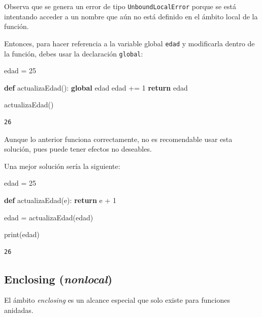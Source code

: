 \documentclass[
  spanish,
  letterpaper,
]{scrbook}
\newenvironment{Shaded}{\begin{snugshade}}{\end{snugshade}}
\newcommand{\BuiltInTok}[1]{\textcolor[rgb]{0.00,0.23,0.31}{#1}}
\newcommand{\ControlFlowTok}[1]{\textcolor[rgb]{0.00,0.23,0.31}{\textbf{#1}}}
\newcommand{\DecValTok}[1]{\textcolor[rgb]{0.68,0.00,0.00}{#1}}
\newcommand{\KeywordTok}[1]{\textcolor[rgb]{0.00,0.23,0.31}{\textbf{#1}}}
\newcommand{\NormalTok}[1]{\textcolor[rgb]{0.00,0.23,0.31}{#1}}
\newcommand{\OperatorTok}[1]{\textcolor[rgb]{0.37,0.37,0.37}{#1}}
\theoremstyle{definition}
\theoremstyle{remark}
\begin{document}
Observa que se genera un error de tipo \texttt{UnboundLocalError} porque
se está intentando acceder a un nombre que aún no está definido en el
ámbito local de la función.

Entonces, para hacer referencia a la variable global \texttt{edad} y
modificarla dentro de la función, debes usar la declaración
\texttt{global}:

\begin{Shaded}
\begin{Highlighting}[]
\NormalTok{edad }\OperatorTok{=} \DecValTok{25}

\KeywordTok{def}\NormalTok{ actualizaEdad():}
    \KeywordTok{global}\NormalTok{ edad}
\NormalTok{    edad }\OperatorTok{+=} \DecValTok{1}
    \ControlFlowTok{return}\NormalTok{ edad}

\NormalTok{actualizaEdad()}
\end{Highlighting}
\end{Shaded}

\begin{verbatim}
26
\end{verbatim}

Aunque lo anterior funciona correctamente, no es recomendable usar esta
solución, pues puede tener efectos no deseables.

Una mejor solución sería la siguiente:

\begin{Shaded}
\begin{Highlighting}[]
\NormalTok{edad }\OperatorTok{=} \DecValTok{25}

\KeywordTok{def}\NormalTok{ actualizaEdad(e):}
    \ControlFlowTok{return}\NormalTok{ e }\OperatorTok{+} \DecValTok{1}

\NormalTok{edad }\OperatorTok{=}\NormalTok{ actualizaEdad(edad)}

\BuiltInTok{print}\NormalTok{(edad)}
\end{Highlighting}
\end{Shaded}

\begin{verbatim}
26
\end{verbatim}

\subsection{\texorpdfstring{Enclosing
(\emph{nonlocal})}{Enclosing (nonlocal)}}\label{enclosing-nonlocal}

El ámbito \emph{enclosing} es un alcance especial que solo existe para
funciones anidadas.
\end{document}
